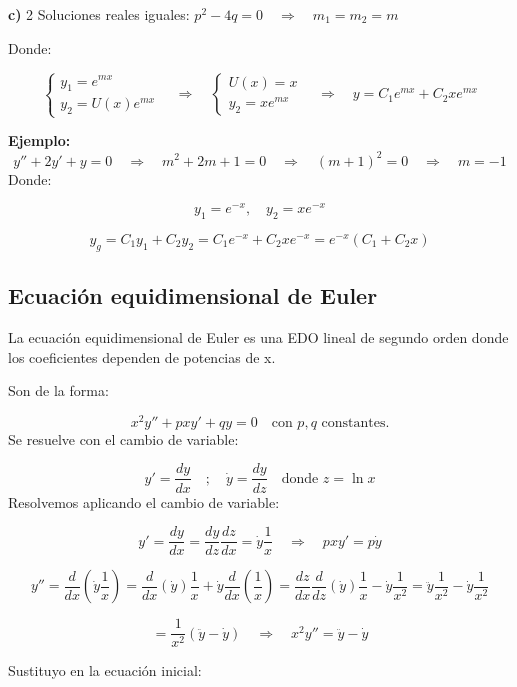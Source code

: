 \documentclass[a4paper,12pt]{article}
\begin{document}
\newpage
\textbf{c)} 2 Soluciones reales iguales: \quad \( p^2 - 4q = 0 \quad \Rightarrow \quad m_1 = m_2 = m \)

\medskip
Donde:

\[
\begin{cases}
y_1 = e^{mx} \\
y_2 = U(x) e^{mx}
\end{cases}
\quad \Rightarrow \quad
\begin{cases}
U(x) = x \\
y_2 = x e^{mx}
\end{cases}
\quad \Rightarrow \quad
y = C_1 e^{mx} + C_2 x e^{mx}
\]

\medskip
\noindent
\textbf{Ejemplo:}
\vspace{0,1 em}
\[
y'' + 2y' + y = 0 
\quad \Rightarrow \quad 
m^2 + 2m + 1 = 0 
\quad \Rightarrow \quad 
(m + 1)^2 = 0 
\quad \Rightarrow \quad 
m = -1
\]
Donde:

\[
y_1 = e^{-x}, \quad 
y_2 = x e^{-x}
\]

\[
y_g = C_1 y_1 + C_2 y_2 = C_1 e^{-x} + C_2 x e^{-x} = e^{-x}(C_1 + C_2 x)
\]

\subsection{Ecuación equidimensional de Euler}
\noindent
La ecuación equidimensional de Euler es una EDO lineal de segundo orden donde los coeficientes dependen de potencias de x.

\medskip
\noindent
Son de la forma:

\[
x^2 y'' + p x y' + q y = 0 
\quad \text{con } p, q \text{ constantes.}
\]
Se resuelve con el cambio de variable:

\[
y' = \frac{dy}{dx} \quad ; \quad
\dot{y} = \frac{dy}{dz}
\quad \text{donde } z = \ln x
\]
Resolvemos aplicando el cambio de variable:

\[
y' = \frac{dy}{dx} = \frac{dy}{dz} \frac{dz}{dx} = \dot{y}\frac{1}{x}
\quad \Rightarrow \quad 
pxy' = p\dot{y}
\]

\[
y'' = \frac{d}{dx} (\dot{y}\frac{1}{x}) = \frac{d}{dx} (\dot{y})\frac{1}{x} + \dot{y}\frac{d}{dx}(\frac{1}{x})
= \frac{dz}{dx} \frac{d}{dz}(\dot{y})\frac{1}{x} - \dot{y}\frac{1}{x^2}
= \ddot{y} \frac{1}{x^2} - \dot{y}\frac{1}{x^2}
\]

\[
= \frac{1}{x^2}(\ddot{y} - \dot{y}) \quad \Rightarrow \quad 
x^2 y'' = \ddot{y} - \dot{y}
\]

\newpage
\noindent
Sustituyo en la ecuación inicial:
\end{document}
